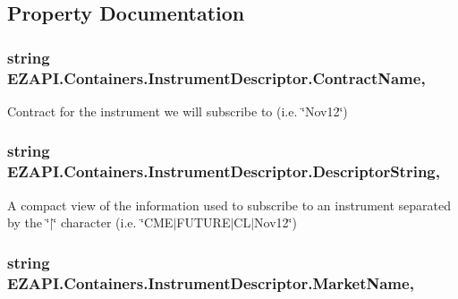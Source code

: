 \subsection{Property Documentation}
\hypertarget{class_e_z_a_p_i_1_1_containers_1_1_instrument_descriptor_a542114edf9499c5da72c14e10d3e95c3}{
\subsubsection[{Contract\-Name}]{\setlength{\rightskip}{0pt plus 5cm}string E\-Z\-A\-P\-I.\-Containers.\-Instrument\-Descriptor.\-Contract\-Name\hspace{0.3cm}{\ttfamily [get]}, {\ttfamily [set]}}}\label{class_e_z_a_p_i_1_1_containers_1_1_instrument_descriptor_a542114edf9499c5da72c14e10d3e95c3}


Contract for the instrument we will subscribe to (i.\-e. \char`\"{}\-Nov12\char`\"{}) 

\hypertarget{class_e_z_a_p_i_1_1_containers_1_1_instrument_descriptor_af3263bdcd2fba81dbdea077e68dd920e}{
\subsubsection[{Descriptor\-String}]{\setlength{\rightskip}{0pt plus 5cm}string E\-Z\-A\-P\-I.\-Containers.\-Instrument\-Descriptor.\-Descriptor\-String\hspace{0.3cm}{\ttfamily [get]}, {\ttfamily [set]}}}\label{class_e_z_a_p_i_1_1_containers_1_1_instrument_descriptor_af3263bdcd2fba81dbdea077e68dd920e}


A compact view of the information used to subscribe to an instrument separated by the \char`\"{}$|$\char`\"{} character (i.\-e. \char`\"{}\-C\-M\-E$|$\-F\-U\-T\-U\-R\-E$|$\-C\-L$|$\-Nov12\char`\"{}) 

\hypertarget{class_e_z_a_p_i_1_1_containers_1_1_instrument_descriptor_a8def1a58d25def5cfc159311fa52a048}{
\subsubsection[{Market\-Name}]{\setlength{\rightskip}{0pt plus 5cm}string E\-Z\-A\-P\-I.\-Containers.\-Instrument\-Descriptor.\-Market\-Name\hspace{0.3cm}{\ttfamily [get]}, {\ttfamily [set]}}}\label{class_e_z_a_p_i_1_1_containers_1_1_instrument_descriptor_a8def1a58d25def5cfc159311fa52a048}


